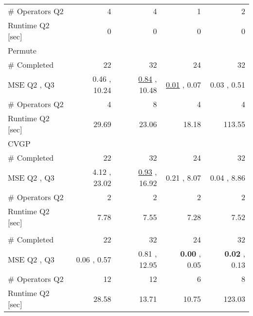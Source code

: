 \begin{tabularx}{\textwidth}{lRRRR}
\qquad \# Operators Q2  &  4\phantom{.00}  &  4\phantom{.00}  &  1\phantom{.00}  &  2\phantom{.00}  \\ 
\qquad Runtime Q2 [sec]  &  0\phantom{.00}  &  0\phantom{.00}  &  0\phantom{.00}  &  0\phantom{.00}  \\ 
Permute  &     &     &     &     \\ 
\qquad  \# Completed  &  22\phantom{.00}  &  32\phantom{.00}  &  24\phantom{.00}  &  32\phantom{.00}  \\ 
\qquad MSE Q2 ,  Q3  &  0.46  ,  10.24  &  \underline{0.84}  ,  10.48  &  \underline{0.01}  ,  0.07  &  0.03  ,  0.51  \\ 
\qquad \# Operators Q2  &  4\phantom{.00}  &  8\phantom{.00}  &  4\phantom{.00}  &  4\phantom{.00}  \\ 
\qquad Runtime Q2 [sec]  &  29.69  &  23.06  &  18.18  &  113.55  \\ 
CVGP  &     &     &     &     \\ 
\qquad  \# Completed  &  22\phantom{.00}  &  32\phantom{.00}  &  24\phantom{.00}  &  32\phantom{.00}  \\ 
\qquad MSE Q2 ,  Q3  &  4.12  ,  23.02  &  \underline{0.93}  ,  16.92  &  0.21  ,  8.07  &  0.04  ,  8.86  \\ 
\qquad \# Operators Q2  &  2\phantom{.00}  &  2\phantom{.00}  &  2\phantom{.00}  &  2\phantom{.00}  \\ 
\qquad Runtime Q2 [sec]  &  7.78  &  7.55  &  7.28  &  7.52  \\ 
\ours{}  &     &     &     &     \\ 
\qquad  \# Completed  &  22\phantom{.00}  &  32\phantom{.00}  &  24\phantom{.00}  &  32\phantom{.00}  \\ 
\qquad MSE Q2 ,  Q3  &  0.06  ,  0.57  &  0.81  ,  12.95  &  \textbf{0.00}  ,  0.05  &  \textbf{0.02}  ,  0.13  \\ 
\qquad \# Operators Q2  &  12\phantom{.00}  &  12\phantom{.00}  &  6\phantom{.00}  &  8\phantom{.00}  \\ 
\qquad Runtime Q2 [sec]  &  28.58  &  13.71  &  10.75  &  123.03  \\ 
\bottomrule
\end{tabularx}{\textwidth}

